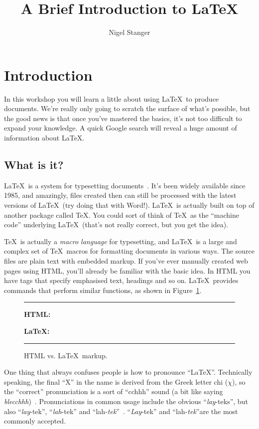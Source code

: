 \documentclass[12pt,a4paper,pdftex]{article}
\title{A Brief Introduction to \LaTeX}
\author{Nigel Stanger}
\begin{document}
\maketitle


\section{Introduction}
\label{sec-intro}

In this workshop you will learn a little about using \LaTeX\ to produce documents. We're really only going to scratch the surface of what's possible, but the good news is that once you've mastered the basics, it's not too difficult to expand your knowledge. A quick Google search will reveal a huge amount of information about \LaTeX.


\subsection{What is it?}
\label{sec-what}

\LaTeX\ is a system for typesetting documents~\cite{UsersGuide}. It's been widely available since 1985, and amazingly, files created then can still be processed with the latest versions of \LaTeX\ (try doing that with Word!). \LaTeX\ is actually built on top of another package called \TeX. You could sort of think of \TeX\ as the ``machine code'' underlying \LaTeX\ (that's not really correct, but you get the idea).

\TeX\ is actually a \emph{macro language} for typesetting, and \LaTeX\ is a large and complex set of \TeX\ macros for formatting documents in various ways. The source files are plain text with embedded markup. If you've ever manually created web pages using HTML, you'll already be familiar with the basic idea. In HTML you have tags that specify emphasised text, headings and so on. \LaTeX\ provides commands that perform similar functions, as shown in Figure~\ref{fig-HTMLcomparison}.

\begin{figure}
	\hrule\medskip
	\textbf{HTML:}

	\bigskip
	
	\textbf{\LaTeX:}

	\hrule
	\caption{HTML vs. \LaTeX\ markup.}
	\label{fig-HTMLcomparison}
\end{figure}

One thing that always confuses people is how to pronounce ``\LaTeX''. Technically speaking, the final ``X'' in the name is derived from the Greek letter chi ($\chi$), so the ``correct'' pronunciation is a sort of ``cchhh'' sound (a bit like saying \emph{blecchhh})~\cite{TeXBook}. Pronunciations in common usage include the obvious ``\emph{lay}-teks'', but also ``\emph{lay}-tek'', ``\emph{lah}-tek'' and ``lah-\emph{tek}''~\cite{UsersGuide}. ``\emph{Lay}-tek''  and ``lah-\emph{tek}''are the most commonly accepted.
\end{document}

